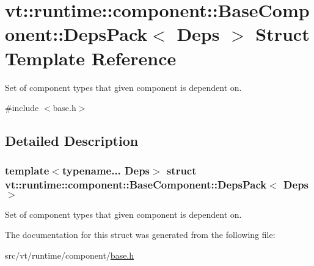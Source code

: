 \hypertarget{structvt_1_1runtime_1_1component_1_1_base_component_1_1_deps_pack}{}\section{vt\+:\+:runtime\+:\+:component\+:\+:Base\+Component\+:\+:Deps\+Pack$<$ Deps $>$ Struct Template Reference}
\label{structvt_1_1runtime_1_1component_1_1_base_component_1_1_deps_pack}


Set of component types that given component is dependent on.  




{\ttfamily \#include $<$base.\+h$>$}



\subsection{Detailed Description}
\subsubsection*{template$<$typename... Deps$>$\newline
struct vt\+::runtime\+::component\+::\+Base\+Component\+::\+Deps\+Pack$<$ Deps $>$}

Set of component types that given component is dependent on. 

The documentation for this struct was generated from the following file\+:\begin{DoxyCompactItemize}
\item 
src/vt/runtime/component/\hyperlink{runtime_2component_2base_8h}{base.\+h}\end{DoxyCompactItemize}
